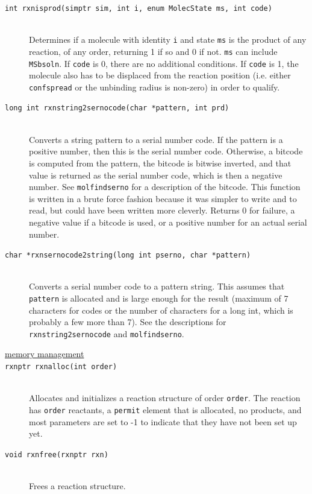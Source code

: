 \documentclass {scrbook}
\newcommand {\ttt} {\texttt}
\begin{document}
\begin{description}
\item[\ttt{int rxnisprod(simptr sim, int i, enum MolecState ms, int code)}]
\hfill \\
Determines if a molecule with identity \ttt{i} and state \ttt{ms} is the product of any reaction, of any order, returning 1 if so and 0 if not. \ttt{ms} can include \ttt{MSbsoln}. If \ttt{code} is 0, there are no additional conditions. If \ttt{code} is 1, the molecule also has to be displaced from the reaction position (i.e. either \ttt{confspread} or the unbinding radius is non-zero) in order to qualify.

\item[\ttt{long int rxnstring2sernocode(char *pattern, int prd)}]
\hfill \\
Converts a string pattern to a serial number code. If the pattern is a positive number, then this is the serial number code. Otherwise, a bitcode is computed from the pattern, the bitcode is bitwise inverted, and that value is returned as the serial number code, which is then a negative number. See \ttt{molfindserno} for a description of the bitcode. This function is written in a brute force fashion because it was simpler to write and to read, but could have been written more cleverly. Returns 0 for failure, a negative value if a bitcode is used, or a positive number for an actual serial number.

\item[\ttt{char *rxnsernocode2string(long int pserno, char *pattern)}]
\hfill \\
Converts a serial number code to a pattern string. This assumes that \ttt{pattern} is allocated and is large enough for the result (maximum of 7 characters for codes or the number of characters for a long int, which is probably a few more than 7). See the descriptions for \ttt{rxnstring2sernocode} and \ttt{molfindserno}.

\item[\underline{memory management}]

\item[\ttt{rxnptr rxnalloc(int order)}]
\hfill \\
Allocates and initializes a reaction structure of order \ttt{order}. The reaction has \ttt{order} reactants, a \ttt{permit} element that is allocated, no products, and most parameters are set to -1 to indicate that they have not been set up yet.

\item[\ttt{void rxnfree(rxnptr rxn)}]
\hfill \\
Frees a reaction structure.


\end{description}
\end{document}
